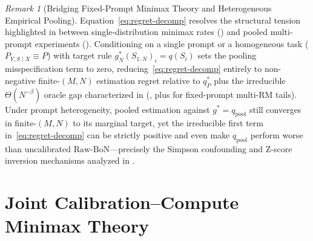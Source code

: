 \documentclass[10pt]{article}
\theoremstyle{plain}
\theoremstyle{definition}
\theoremstyle{remark}
\newtheorem{remark}{Remark}
\begin{document}
\begin{remark}[Bridging Fixed-Prompt Minimax Theory and Heterogeneous Empirical Pooling]
\label{rem:scope}
Equation~\eqref{eq:regret-decomp} resolves the structural tension highlighted in  between single-distribution minimax rates () and pooled multi-prompt experiments (). Conditioning on a single prompt or a homogeneous task ($P_{Y, S \mid X} \equiv P$) with target rule $g_N^*(S_{1:N})_i = q(S_i)$ sets the pooling misspecification term to zero, reducing~\eqref{eq:regret-decomp} entirely to non-negative finite-$(M, N)$ estimation regret relative to $q^*_P$ plus the irreducible $\Theta(N^{-\beta})$ oracle gap characterized in  (, plus  for fixed-prompt multi-RM tails). Under prompt heterogeneity, pooled estimation against $g^* = q_{\mathrm{pool}}$ still converges in finite-$(M, N)$ to its marginal target, yet the irreducible first term in~\eqref{eq:regret-decomp} can be strictly positive and even make $q_{\mathrm{pool}}$ perform worse than uncalibrated $\mathrm{Raw\text{-}BoN}$---precisely the Simpson confounding and Z-score inversion mechanisms analyzed in .
\end{remark}

\section{Joint Calibration--Compute Minimax Theory}
\label{sec:minimax}
\end{document}
